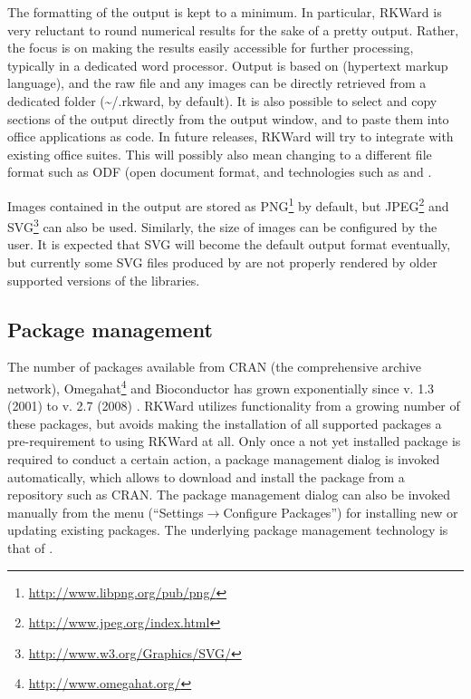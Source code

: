 The formatting of the output is kept to a minimum. In particular,
RKWard is very reluctant to round numerical results for the sake of a
pretty output. Rather, the focus is on making the results easily
accessible for further processing, typically in a dedicated word
processor. Output is based on
 (hypertext markup language), and the raw
 file and any images can be directly
retrieved from a dedicated folder
(\~{}/.rkward, by default). It is also
possible to select and copy sections of the output directly from the
output window, and to paste them into office applications as
 code. In future releases, RKWard will
try to integrate with existing office suites. This
will possibly also mean changing to a different file format such as ODF (open
document format, and technologies such as  and 
\citep{Leisch2002, Kuhn2006}.

Images contained in the output are stored as
PNG\footnote{\url{http://www.libpng.org/pub/png/}} by
default, but JPEG\footnote{\url{http://www.jpeg.org/index.html}} and
SVG\footnote{\url{http://www.w3.org/Graphics/SVG/}}
can also be used. Similarly, the size of
images can be configured by the user. It is expected that SVG will
become the default output format eventually, but currently some SVG
files produced by  are not properly
rendered by older supported versions of the
 libraries.

\subsection{Package management}
\label{sec:package_management}
The number of  packages available from CRAN (the comprehensive  archive
network), Omegahat\footnote{\url{http://www.omegahat.org/}} and Bioconductor \citep{Gentleman2004} has grown exponentially since  v. 1.3
(2001) to  v. 2.7 (2008) \citep{Fox2008, Ligges2003, Visne2009}. RKWard
utilizes functionality from a growing number of these packages, but avoids
making the installation of all supported packages a pre-requirement to using
RKWard at all. Only once a not yet installed package is required to conduct a certain
action, a package management dialog is invoked automatically, which allows to
download and install the package from a repository such as CRAN. The package
management dialog can also be invoked manually from the menu
(``Settings$\rightarrow$Configure Packages'') for installing new or updating existing 
packages. The underlying package management technology is that of 
\citep{Ligges2003, Ripley2005}.

